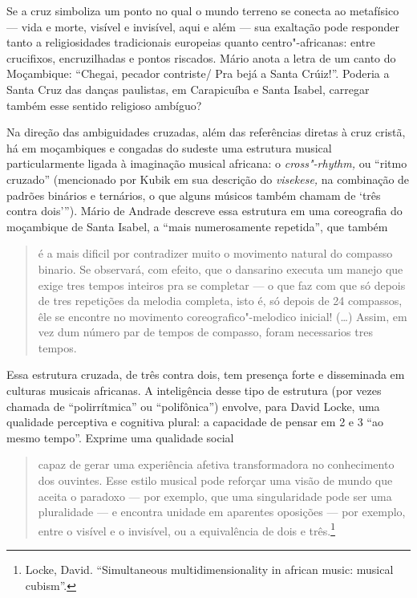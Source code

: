 Se a cruz simboliza um ponto no qual o mundo terreno se conecta ao
metafísico --- vida e morte, visível e invisível, aqui e além --- sua
exaltação pode responder tanto a religiosidades tradicionais europeias
quanto centro"-africanas: entre crucifixos, encruzilhadas e pontos
riscados. Mário anota a letra de um canto do Moçambique: ``Chegai,
pecador contriste/ Pra bejá a Santa Crúiz!''. Poderia a Santa Cruz das
danças paulistas, em Carapicuíba e Santa Isabel, carregar também esse
sentido religioso ambíguo?

Na direção das ambiguidades cruzadas, além das referências diretas à
cruz cristã, há em moçambiques e congadas do sudeste uma estrutura
musical particularmente ligada à imaginação musical africana: o
\emph{cross"-rhythm,} ou ``ritmo cruzado'' (mencionado por Kubik em sua
descrição do \emph{visekese,} na combinação de padrões binários e
ternários, o que alguns músicos também chamam de `três contra dois''').
Mário de Andrade descreve essa estrutura em uma coreografia do
moçambique de Santa Isabel, a ``mais numerosamente repetida'', que
também

\begin{quote}
é a mais dificil por contradizer muito o movimento natural do compasso
binario. Se observará, com efeito, que o dansarino executa um manejo que
exige tres tempos inteiros pra se completar --- o que faz com que só
depois de tres repetições da melodia completa, isto é, só depois de 24
compassos, êle se encontre no movimento coreografico"-melodico inicial!
(\ldots{}) Assim, em vez dum número par de tempos de compasso, foram
necessarios tres tempos.
\end{quote}

Essa estrutura cruzada, de três contra dois, tem presença forte e
disseminada em culturas musicais africanas. A inteligência desse tipo de
estrutura (por vezes chamada de ``polirrítmica'' ou ``polifônica'')
envolve, para David Locke, uma qualidade perceptiva e cognitiva plural:
a capacidade de pensar em 2 e 3 ``ao mesmo tempo''. Exprime uma
qualidade social

\begin{quote}
capaz de gerar uma experiência afetiva transformadora no conhecimento
dos ouvintes. Esse estilo musical pode reforçar uma visão de mundo que
aceita o paradoxo --- por exemplo, que uma singularidade pode ser uma
pluralidade --- e encontra unidade em aparentes oposições --- por exemplo,
entre o visível e o invisível, ou a equivalência de dois e
três.\footnote{Locke, David. ``Simultaneous multidimensionality in
  african music: musical cubism''.}
\end{quote}

